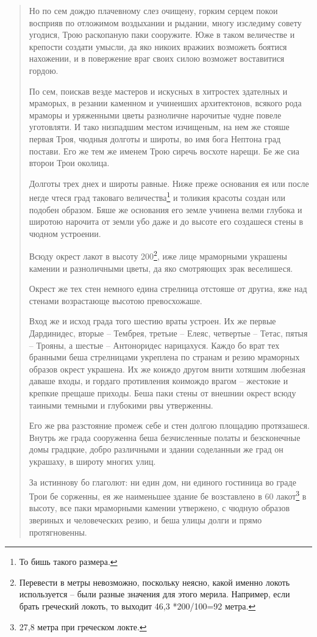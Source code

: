 \begin{quotation}
Но по сем дождю плачевному слез очищену, горким серцем покои восприяв по отложимом воздыхании и рыдании, многу изследиму совету угодися, Трою раскопаную паки сооружите. Юже в таком величестве и крепости создати умысли, да яко никоих вражиих возможеть боятися нахожении, и в повержение враг своих силою возможет воставитися гордою.

По сем, поискав везде мастеров и искусных в хитростех здателных и мраморых, в резании каменном и учинеиших архитектонов, всякого рода мраморы и уряженными цветы разноличне нарочитые чудне повеле уготовляти. И тако низпадшим местом изчищеным, на нем же стояше первая Троя, чюдныя долготы и широты, во имя бога Нептона град постави. Его же тем же именем Трою сиречь восхоте нарещи. Бе же сиа второи Трои околица.

Долготы трех днех и широты равные. Ниже преже основания ея или после негде чтеся град таковаго величества\footnote{То бишь такого размера.} и толикия красоты создан или подобен образом. Бяше же основания его земле учинена велми глубока и широтою нарочита от земли убо даже и до высоте его создашеся стены в чюдном устроении. 

Всюду окрест лакот в высоту 200\footnote{Перевести в метры невозможно, поскольку неясно, какой именно локоть используется – были разные значения для этого мерила. Например, если брать греческий локоть, то выходит 46,3 *200/100=92 метра.}, иже лице мраморными украшены камении и разноличными цветы, да яко смотряющих зрак веселишеся. 

Окрест же тех стен немного едина стрелница отстояше от другиа, яже над стенами возрастающе высотою превосхожаше.

Вход же и исход града того шестию враты устроен. Их же первые Дардинидес, вторые – Тембрея, третьие – Елеяс, четвертые – Тетас, пятыя – Трояны, а шестые – Антоноридес нарицахуся. Каждо бо врат тех бранными беша стрелницами укреплена по странам и резию мраморных образов окрест украшена. Их же коиждо другом внити хотяшим любезная даваше входы, и гордаго противления коимождо врагом – жестокие и крепкие прещаше приходы. Беша паки стены от внешнии окрест всюду таиными темными и глубокими рвы утверженны.

Его же рва разстояние промеж себе и стен долгою площадию протязашеся. Внутрь же града сооруженна беша безчисленные полаты и безсконечные домы градцкие, добро различными и здании соделанныи же град он украшаху, в широту многих улиц.

За истиннову бо глаголют: ни един дом, ни единого гостиница во граде Трои бе сорженны, ея же наименьшее здание бе возставлено в 60 лакот\footnote{27,8 метра при греческом локте.} в высоту, все паки мраморными камении утвержено, с чюдную образов звериных и человеческих резию, и беша улицы долги и прямо протягновенны.


\end{quotation}
